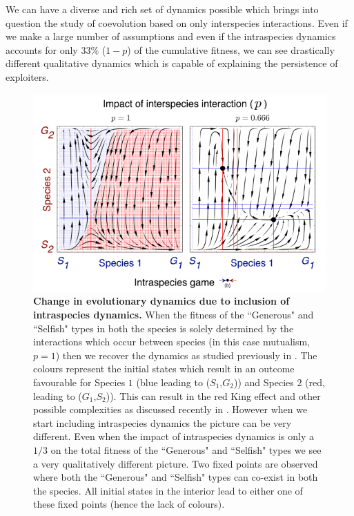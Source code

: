 \documentclass{pnastwo}
\begin{document}
\begin{article}
We can have a diverse and rich set of dynamics possible which brings into question the study of coevolution based on only interspecies interactions. Even if we make a large number of assumptions and even if the intraspecies dynamics accounts for only $33\%$ ($1-p$) of the cumulative fitness, we can see drastically different qualitative dynamics which is capable of explaining the persistence of exploiters.

\begin{figure}
\begin{center}
\includegraphics[width=1.5\columnwidth]{../Figures/mainexample2.pdf}
\caption{
\textbf{Change in evolutionary dynamics due to inclusion of intraspecies dynamics.} When the fitness of the ``Generous" and ``Selfish" types in both the species is solely determined by the interactions which occur between species (in this case mutualism, $p=1$) then we recover the dynamics as studied previously in \cite{gokhale:PRSB:2012}. The colours represent the initial states which result in an outcome favourable for Species $1$ (blue leading to ($S_1$,$G_2$)) and Species $2$ (red, leading to ($G_1$,$S_2$)). This can result in the red King effect and other possible complexities as discussed recently in \cite{gao:SciRep:2015}. However when we start including intraspecies dynamics the picture can be very different.
Even when the impact of intraspecies dynamics is only a $1/3$ on the total fitness of the ``Generous" and ``Selfish" types we see a very qualitatively different picture.
Two fixed points are observed where both the ``Generous" and ``Selfish" types can co-exist in both the species.
All initial states in the interior lead to either one of these fixed points (hence the lack of colours).
}
\end{center}
\end{figure}
\end{article}
\end{document}
